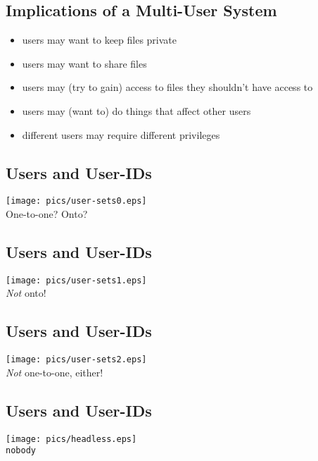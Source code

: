 \documentclass[xga]{xdvislides}
\begin{document}
\subsection{Implications of a Multi-User System}
\begin{itemize}
	\item users may want to keep files private
	\item users may want to share files
	\item users may (try to gain) access to files they shouldn't have access to
	\item users may (want to) do things that affect other users
	\item different users may require different privileges
\end{itemize}

\subsection{Users and User-IDs}
\begin{center}
	\texttt{[image: pics/user-sets0.eps]} \\
	One-to-one?  Onto?
\end{center}

\subsection{Users and User-IDs}
\begin{center}
	\texttt{[image: pics/user-sets1.eps]} \\
	{\em Not} onto!
\end{center}

\subsection{Users and User-IDs}
\begin{center}
	\texttt{[image: pics/user-sets2.eps]} \\
	{\em Not} one-to-one, either!
\end{center}

\subsection{Users and User-IDs}

\begin{center}
	\texttt{[image: pics/headless.eps]} \\
	{\tt nobody}
\end{center}
\end{document}
